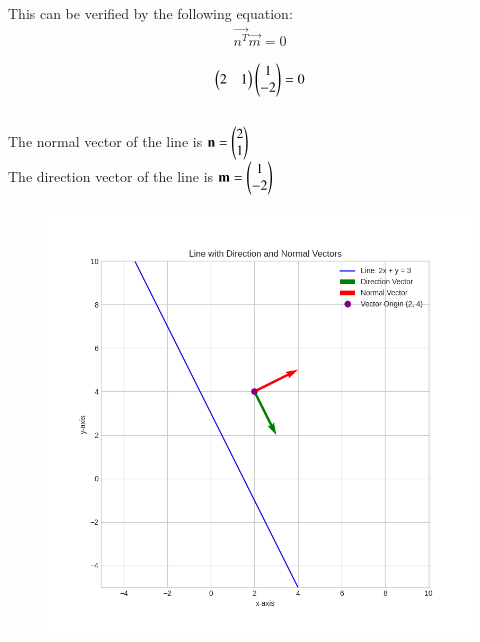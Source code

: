 \documentclass[journal]{IEEEtran}
\begin{document}
This can be verified by the following equation:
\begin{align}
\vec{n^T}\vec{m} = 0
\end{align}

\begin{align}
\begin{pmatrix}2 & 1\end{pmatrix}\begin{pmatrix}1 \\ -2\end{pmatrix} = 0
\end{align}\\

The normal vector of the line is $\mathbf{n} = \begin{pmatrix}2 \\ 1\end{pmatrix}$  \\
The direction vector of the line is $\mathbf{m} = \begin{pmatrix}1 \\ -2\end{pmatrix}$\\

\begin{figure}[h!]
    \centering
    \includegraphics[height=0.5\textheight, keepaspectratio]{figs/Figure_1.png}
    \label{figure_1}
\end{figure}
\end{document}
